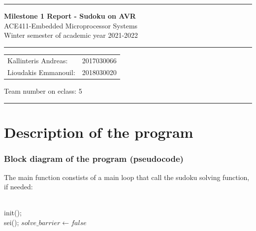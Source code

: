 \documentclass[12pt, a4]{article}
\begin{document}
\noindent \rule{\textwidth}{3pt}
\begin{center}
	{\bf \Large{Milestone 1 Report - Sudoku on AVR}}\\
	ACE411-Embedded Microprocessor Systems \\
	Winter semester of academic year 2021-2022
	\rule{\textwidth}{0.2mm} 
	\begin{tabular}{l r}
		Kallinteris Andreas:& 2017030066 \\ 
		Lioudakis Emmanouil:      &2018030020 
	\end{tabular} \vrule \hspace{3mm}
	\indent	Team number on eclass:  5
	\rule{\textwidth}{1pt}
\end{center}

\section*{Description of the program}
\subsubsection*{Block diagram of the program (pseudocode)}
The main function constists of a main loop that call the sudoku solving function, if needed:
\begin{center}
\begin{algorithmic}
 \\
init(); \\
\noindent sei();
\noindent {} 
        \State $solve\_barrier \gets false$
\EndIf
\EndIf
\EndWhile
\EndFunction 
\end{algorithmic}
\end{center}
\end{document}
